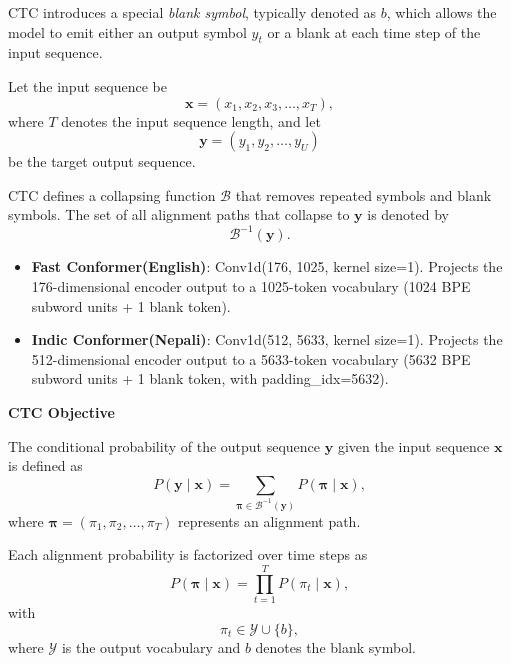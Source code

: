 CTC introduces a special \emph{blank symbol}, typically denoted as \( b \), which
allows the model to emit either an output symbol \( y_t \) or a blank at each time
step of the input sequence.

Let the input sequence be
\begin{equation}
	\mathbf{x} = (x_1, x_2, x_3, \dots, x_T),
\end{equation}
where \( T \) denotes the input sequence length, and let
\begin{equation}
	\mathbf{y} = (y_1, y_2, \dots, y_U)
\end{equation}
be the target output sequence.

CTC defines a collapsing function \( \mathcal{B} \) that removes repeated symbols
and blank symbols. The set of all alignment paths that collapse to \( \mathbf{y} \)
is denoted by
\begin{equation}
	\mathcal{B}^{-1}(\mathbf{y}).
\end{equation}
\begin{itemize}
    \item \textbf{Fast Conformer(English)}: Conv1d(176, 1025, kernel size=1). Projects the 176-dimensional encoder output to a 1025-token vocabulary (1024 BPE subword units + 1 blank token).

    \item \textbf{Indic Conformer(Nepali)}: Conv1d(512, 5633, kernel size=1). Projects the 512-dimensional encoder output to a 5633-token vocabulary (5632 BPE subword units + 1 blank token, with padding\_idx=5632).
\end{itemize}

\textbf{CTC Objective}

The conditional probability of the output sequence \( \mathbf{y} \) given the input
sequence \( \mathbf{x} \) is defined as
\begin{equation}
	P(\mathbf{y} \mid \mathbf{x}) =
	\sum_{\boldsymbol{\pi} \in \mathcal{B}^{-1}(\mathbf{y})}
	P(\boldsymbol{\pi} \mid \mathbf{x}),
\end{equation}
where \( \boldsymbol{\pi} = (\pi_1, \pi_2, \dots, \pi_T) \) represents an alignment path.

Each alignment probability is factorized over time steps as
\begin{equation}
	P(\boldsymbol{\pi} \mid \mathbf{x}) =
	\prod_{t=1}^{T} P(\pi_t \mid \mathbf{x}),
\end{equation}
with
\begin{equation}
	\pi_t \in \mathcal{Y} \cup \{ b \},
\end{equation}
where \( \mathcal{Y} \) is the output vocabulary and \( b \) denotes the blank symbol.

